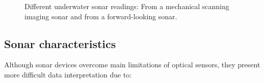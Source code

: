 \documentclass[final,5p,times]{elsarticle}
\begin{document}
\begin{figure}[t]
    \centering
    \caption{Different underwater sonar readings: 
    From a mechanical scanning imaging sonar and 
    from a forward-looking sonar.}
    \captionsetup{justification=justified}
    \label{fig:sonar_devices}
\end{figure}


\subsection{Sonar characteristics}
\label{sonar:characteristics}

Although sonar devices overcome main limitations of optical sensors, they
present more difficult data interpretation due to:
\end{document}
